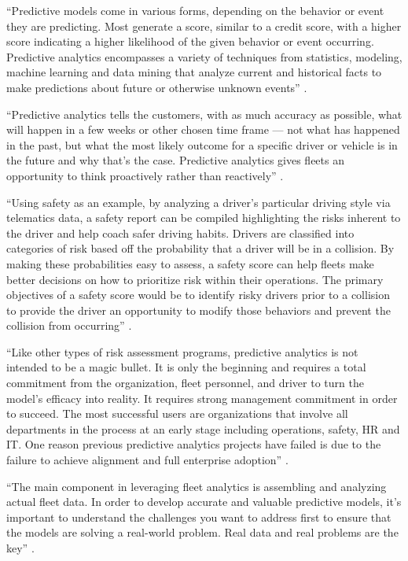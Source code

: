 ``Predictive models come in various forms, depending on the behavior or event they are predicting. Most generate a score, similar to a credit score, with a higher score indicating a higher likelihood of the given behavior or event occurring. Predictive analytics encompasses a variety of techniques from statistics, modeling, machine learning and data mining that analyze current and historical facts to make predictions about future or otherwise unknown events'' \cite{Suizo2015decisions}.

``Predictive analytics tells the customers, with as much accuracy as possible, what will happen in a few weeks or other chosen time frame — not what has happened in the past, but what the most likely outcome for a specific driver or vehicle is in the future and why that’s the case. Predictive analytics gives fleets an opportunity to think proactively rather than reactively'' \cite{Suizo2015decisions}.

``Using safety as an example, by analyzing a driver’s particular driving style via telematics data, a safety report can be compiled highlighting the risks inherent to the driver and help coach safer driving habits. Drivers are classified into categories of risk based off the probability that a driver will be in a collision. By making these probabilities easy to assess, a safety score can help fleets make better decisions on how to prioritize risk within their operations. The primary objectives of a safety score would be to identify risky drivers prior to a collision to provide the driver an opportunity to modify those behaviors and prevent the collision from occurring'' \cite{Suizo2015decisions}.

``Like other types of risk assessment programs, predictive analytics is not intended to be a magic bullet. It is only the beginning and requires a total commitment from the organization, fleet personnel, and driver to turn the model’s efficacy into reality. It requires strong management commitment in order to succeed. The most successful users are organizations that involve all departments in the process at an early stage including operations, safety, HR and IT. One reason previous predictive analytics projects have failed is due to the failure to achieve alignment and full enterprise adoption'' \cite{Suizo2015decisions}.

``The main component in leveraging fleet analytics is assembling and analyzing actual fleet data. In order to develop accurate and valuable predictive models, it’s important to understand the challenges you want to address first to ensure that the models are solving a real-world problem. Real data and real problems are the key'' \cite{Suizo2015decisions}.

